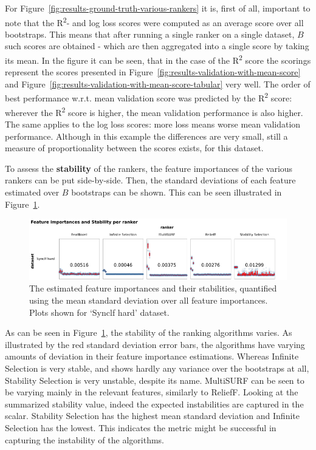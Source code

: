 \documentclass[../main.tex]{subfiles}
\begin{document}
For Figure~\ref{fig:results-ground-truth-various-rankers} it is, first of all, important to note that the R\textsuperscript{2}- and log loss scores were computed as an average score over all bootstraps. This means that after running a single ranker on a single dataset, $B$ such scores are obtained - which are then aggregated into a single score by taking its mean. In the figure it can be seen, that in the case of the R\textsuperscript{2} score the scorings represent the scores presented in Figure~\ref{fig:results-validation-with-mean-score} and Figure~\ref{fig:results-validation-with-mean-score-tabular} very well. The order of best performance w.r.t. mean validation score was predicted by the R\textsuperscript{2} score: wherever the R\textsuperscript{2} score is higher, the mean validation performance is also higher. The same applies to the log loss scores: more loss means worse mean validation performance. Although in this example the differences are very small, still a measure of proportionality between the scores exists, for this dataset.


To assess the \textbf{stability} of the rankers, the feature importances of the various rankers can be put side-by-side. Then, the standard deviations of each feature estimated over $B$ bootstraps can be shown. This can be seen illustrated in Figure~\ref{fig:results-importances-stability-multiple-rankers}.

\begin{figure}[ht]
    \centering
    \includegraphics[width=\linewidth]{report/images/results-importances-stability-multiple-rankers.png}
    \caption{The estimated feature importances and their stabilities, quantified using the mean standard deviation over all feature importances. Plots shown for `Synclf hard' dataset.}
    \label{fig:results-importances-stability-multiple-rankers}
\end{figure}

As can be seen in Figure~\ref{fig:results-importances-stability-multiple-rankers}, the stability of the ranking algorithms varies. As illustrated by the red standard deviation error bars, the algorithms have varying amounts of deviation in their feature importance estimations. Whereas Infinite Selection is very stable, and shows hardly any variance over the bootstraps at all, Stability Selection is very unstable, despite its name. MultiSURF can be seen to be varying mainly in the relevant features, similarly to ReliefF. Looking at the summarized stability value, indeed the expected instabilities are captured in the scalar. Stability Selection has the highest mean standard deviation and Infinite Selection has the lowest. This indicates the metric might be successful in capturing the instability of the algorithms.
\end{document}

